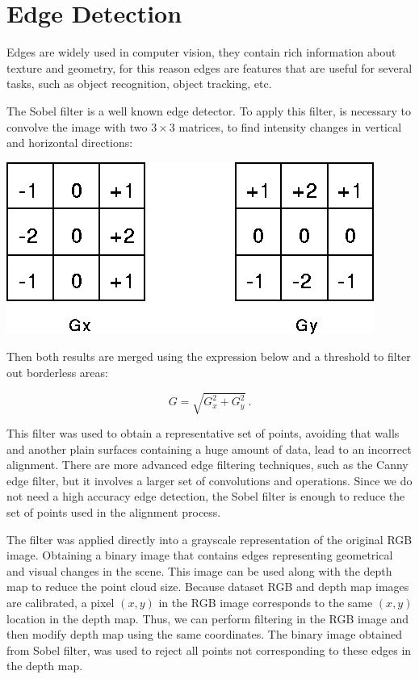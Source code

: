 \section{Edge Detection}

Edges are widely used in computer vision, they contain rich information about texture 
and geometry, for this reason edges are features that are useful for several tasks, 
such as object recognition, object tracking, etc.


The Sobel filter is a well known edge detector. To apply this filter, is necessary to 
convolve the image with two $3\times3$ matrices, to find intensity changes in vertical and 
horizontal directions:

\begin{center}
\includegraphics[scale=0.35]{images/sobel}
\end{center}

Then both results are merged using the expression below and a threshold to filter out borderless areas:

\begin{equation}
G = \sqrt{G_x^2+ G_y^2}\ .
\label{eq:sobelGrad}
\end{equation}

This filter was used to obtain a representative set of points, avoiding that walls and another 
plain surfaces containing a huge amount of data, lead to an incorrect alignment.
There are more advanced edge filtering techniques, such as the Canny edge filter, but it involves 
a larger set of convolutions and operations. Since we do not need a high accuracy edge detection, the Sobel 
filter is enough to reduce the set of points used in the alignment process. 

The filter was applied directly into a grayscale representation of the original RGB image. Obtaining a binary image 
that contains edges representing geometrical and visual changes in the scene. 
This image can be used along with the depth map to reduce the point cloud size. Because dataset RGB and depth map images are 
calibrated, a pixel $(x,y)$ in the RGB image corresponds to the same $(x,y)$ location in the depth map. Thus, we can perform filtering 
in the RGB image and then modify depth map using the same coordinates. The binary image obtained from Sobel filter, was used 
to reject all points not corresponding
to these edges in the depth map. 

